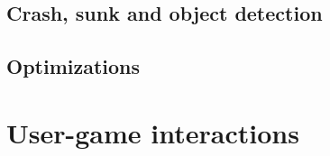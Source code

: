 \documentclass[a4paper, 11pt]{article}
\begin{document}
\subsection{Crash, sunk and object detection}
\subsection{Optimizations}

\section{User-game interactions}
\end{document}
